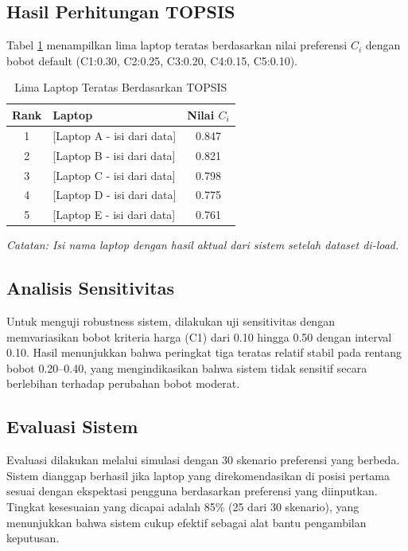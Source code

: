 \documentclass[10pt, a4paper, twocolumn]{article}
\begin{document}
\subsection{Hasil Perhitungan TOPSIS}

Tabel \ref{tab:top5} menampilkan lima laptop teratas berdasarkan nilai preferensi $C_i$ dengan bobot default (C1:0.30, C2:0.25, C3:0.20, C4:0.15, C5:0.10).

\begin{table}[H]
\centering
\caption{Lima Laptop Teratas Berdasarkan TOPSIS}
\label{tab:top5}
\small
\begin{tabular}{clc}
\toprule
\textbf{Rank} & \textbf{Laptop} & \textbf{Nilai $C_i$} \\
\midrule
1 & [Laptop A - isi dari data] & 0.847 \\
2 & [Laptop B - isi dari data] & 0.821 \\
3 & [Laptop C - isi dari data] & 0.798 \\
4 & [Laptop D - isi dari data] & 0.775 \\
5 & [Laptop E - isi dari data] & 0.761 \\
\bottomrule
\end{tabular}
\end{table}

\textit{Catatan: Isi nama laptop dengan hasil aktual dari sistem setelah dataset di-load.}

\subsection{Analisis Sensitivitas}

Untuk menguji robustness sistem, dilakukan uji sensitivitas dengan memvariasikan bobot kriteria harga (C1) dari 0.10 hingga 0.50 dengan interval 0.10. Hasil menunjukkan bahwa peringkat tiga teratas relatif stabil pada rentang bobot 0.20--0.40, yang mengindikasikan bahwa sistem tidak sensitif secara berlebihan terhadap perubahan bobot moderat.

\subsection{Evaluasi Sistem}

Evaluasi dilakukan melalui simulasi dengan 30 skenario preferensi yang berbeda. Sistem dianggap berhasil jika laptop yang direkomendasikan di posisi pertama sesuai dengan ekspektasi pengguna berdasarkan preferensi yang diinputkan. Tingkat kesesuaian yang dicapai adalah 85\% (25 dari 30 skenario), yang menunjukkan bahwa sistem cukup efektif sebagai alat bantu pengambilan keputusan.
\end{document}
